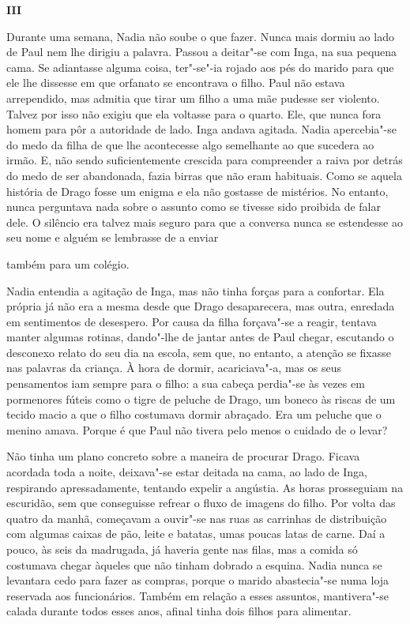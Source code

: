 \pagebreak
\vspace*{1.8cm}
\noindent{}\textbf{III}

\bigskip

Durante uma semana, Nadia não soube o que fazer. Nunca mais dormiu ao
lado de Paul nem lhe dirigiu a palavra. Passou a deitar"-se com Inga, na
sua pequena cama. Se adiantasse alguma coisa, ter"-se"-ia rojado aos pés
do marido para que ele lhe dissesse em que orfanato se encontrava o
filho. Paul não estava arrependido, mas admitia que tirar um filho a uma
mãe pudesse ser violento. Talvez por isso não exigiu que ela voltasse
para o quarto. Ele, que nunca fora homem para pôr a autoridade de lado.
Inga andava agitada. Nadia apercebia"-se do medo da filha de que lhe
acontecesse algo semelhante ao que sucedera ao irmão. E, não sendo
suficientemente crescida para compreender a raiva por detrás do medo de
ser abandonada, fazia birras que não eram habituais. Como se aquela
história de Drago fosse um enigma e ela não gostasse de mistérios. No
entanto, nunca perguntava nada sobre o assunto como se tivesse sido
proibida de falar dele. O silêncio era talvez mais seguro para que a
conversa nunca se estendesse ao seu nome e alguém se lembrasse de a
enviar

também para um colégio.



Nadia entendia a agitação de Inga, mas não tinha forças para a
confortar. Ela própria já não era a mesma desde que Drago desaparecera,
mas outra, enredada em sentimentos de desespero. Por causa da filha
forçava"-se a reagir, tentava manter algumas rotinas, dando"-lhe de jantar
antes de Paul chegar, escutando o desconexo relato do seu dia na escola,
sem que, no entanto, a atenção se fixasse nas palavras da criança. À
hora de dormir, acariciava"-a, mas os seus pensamentos iam sempre para
o filho: a sua cabeça perdia"-se às vezes em pormenores fúteis como o
tigre de peluche de Drago, um boneco às riscas de um tecido macio a que
o filho costumava dormir abraçado. Era um peluche que o menino amava.
Porque é que Paul não tivera pelo menos o cuidado de o levar?

Não tinha um plano concreto sobre a maneira de procurar Drago. Ficava acordada toda a noite, deixava"-se estar deitada na
cama, ao lado de Inga, respirando apressadamente, tentando expelir a
angústia. As horas prosseguiam na escuridão, sem que conseguisse
refrear o fluxo de imagens do filho. Por volta das quatro da manhã,
começavam a ouvir"-se nas ruas as carrinhas de distribuição com algumas
caixas de pão, leite e batatas, umas poucas latas de carne. Daí a pouco,
às seis da madrugada, já haveria gente nas filas, mas a comida só
costumava chegar àqueles que não tinham dobrado a esquina. Nadia nunca
se levantara cedo para fazer as compras, porque o marido abastecia"-se
numa loja reservada aos funcionários. Também em relação a esses
assuntos, mantivera"-se calada durante todos esses anos, afinal tinha
dois filhos para alimentar.

